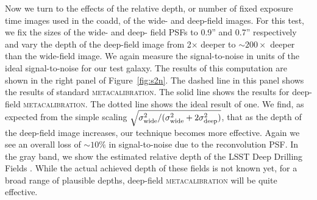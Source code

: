 \documentclass[twocolumn]{openjournal}
\makeatletter
\newcommand{\mcal}{\textsc{metacalibration}\@\xspace}
\makeatother
\begin{document}
Now we turn to the effects of the relative depth, or number of fixed exposure
time images used in the coadd, of the wide- and deep-field images. For
this test, we fix the sizes of the wide- and deep- field PSFs to 0.9'' and 0.7''
respectively and vary the depth of the deep-field image from 2$\times$ deeper to
$\sim200\times$ deeper than the wide-field image. We again measure the
signal-to-noise in units of the ideal signal-to-noise for our test galaxy. The results
of this computation are shown in the right panel of Figure~\ref{fig:s2n}. The dashed
line in this panel shows the results of standard \mcal. The solid line shows the results
for deep-field \mcal. The dotted line shows the ideal result of one. We find, as
expected from the simple scaling
$\sqrt{\sigma^2_{\rm wide}/(\sigma^2_{\rm wide} + 2\sigma^2_{\rm deep})}$,
that as the depth of the deep-field image increases, our
technique becomes more effective. Again we see an overall loss of $\sim10\%$ in
signal-to-noise due to the reconvolution PSF. In the gray band, we show the estimated
relative depth of the LSST Deep Drilling Fields \citep[DDF,][]{lsst-ddf-depth}. While
the actual achieved depth of these fields is not known yet, for a broad range of
plausible depths, deep-field \mcal will be quite effective.
\end{document}
